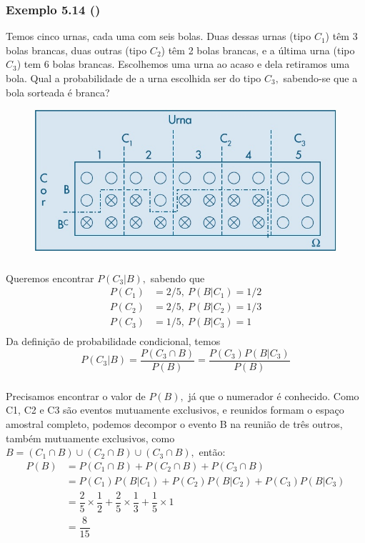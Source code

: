 \documentclass[14pt,aspectratio=1610]{beamer}
\begin{document}
\begin{frame}{}
\frametitle{Exemplo 5.14 (\cite{Morettin09})}
  \begin{block}{}
  \justifying
Temos cinco urnas, cada uma com seis bolas. Duas dessas urnas (tipo $C_1$) têm 3 bolas brancas, duas outras (tipo $C_2$) têm 2 bolas brancas, e a última urna (tipo $C_3$) tem 6 bolas brancas. Escolhemos uma urna ao acaso e dela retiramos uma bola. Qual a probabilidade de a urna escolhida ser do tipo $C_3,$ sabendo-se que a bola sorteada é branca?
\end{block}
    \begin{figure}[H]
    \centering
    \includegraphics[height=0.3\textwidth,width=15cm]{Figuras/ex5_14}
    \end{figure}
  
\end{frame}


\begin{frame}{}
\frametitle{}
\begin{block}{}
\justifying
Queremos encontrar $P(C_3|B),$ sabendo que
\begin{align*}
P(C_{1})&=2/5,\ P(B|C_{1})=1/2\\
P(C_{2})&=2/5,\ P(B|C_{2})=1/3\\
P(C_{3})&=1/5,\ P(B|C_{3})=1\\
\end{align*}
Da definição de probabilidade condicional, temos
$$P(C_{3}|B)=\dfrac{P(C_{3}\cap B)}{P(B)}=\dfrac{P(C_{3})P(B|C_{3})}{P(B)}$$
\end{block}
\end{frame}

\begin{frame}{}
\frametitle{}
\begin{block}{}
\justifying
Precisamos encontrar o valor de $P(B),$ já que o numerador é conhecido. Como C1,
C2 e C3 são eventos mutuamente exclusivos, e reunidos formam o espaço amostral
completo, podemos decompor o evento B na reunião de três outros, também mutuamente
exclusivos, como $B=(C_{1}\cap B)\cup (C_{2}\cap B)\cup (C_{3}\cap B),$ então:
\begin{align*}
P(B)&=P(C_{1}\cap B)+P(C_{2}\cap B)+P(C_{3}\cap B)\\
&=P(C_{1})P(B|C_{1})+P(C_{2})P(B|C_{2})+P(C_{3})P(B|C_{3})\\
&=\dfrac{2}{5}\times \dfrac{1}{2}+\dfrac{2}{5}\times \dfrac{1}{3}+\dfrac{1}{5}\times 1\\
&=\dfrac{8}{15}
\end{align*}
\end{block}
\end{frame}
\end{document}
